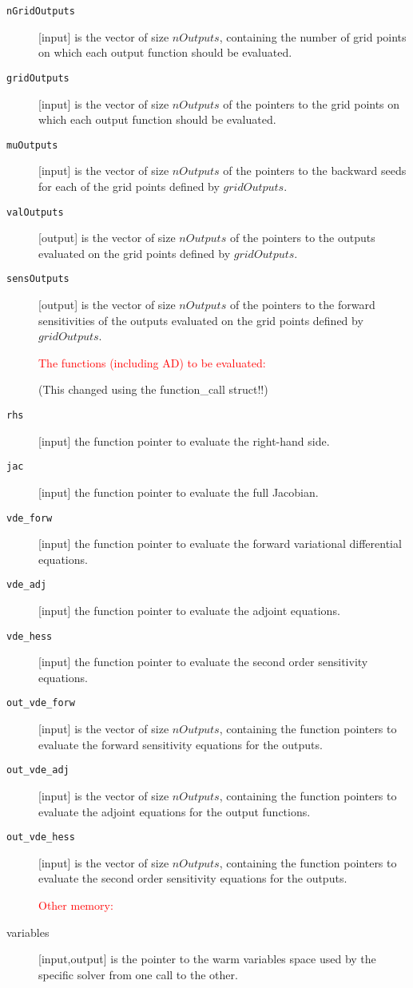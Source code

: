 \documentclass{report}
\begin{document}
\begin{description}
\item[{\tt nGridOutputs}] [input] is the vector of size $nOutputs$, containing the number of grid points on which each output function should be evaluated.
\item[{\tt gridOutputs}] [input] is the vector of size $nOutputs$ of the pointers to the grid points on which each output function should be evaluated.
\item[{\tt muOutputs}] [input] is the vector of size $nOutputs$ of the pointers to the backward seeds for each of the grid points defined by $gridOutputs$.
\item[{\tt valOutputs}] [output] is the vector of size $nOutputs$ of the pointers to the outputs evaluated on the grid points defined by $gridOutputs$.
\item[{\tt sensOutputs}] [output] is the vector of size $nOutputs$ of the pointers to the forward sensitivities of the outputs evaluated on the grid points defined by $gridOutputs$.
\item[] \textcolor{red}{The functions (including AD) to be evaluated:}
\item[] (This changed using the  function\_call struct!!)
\item[{\tt rhs}] [input] the function pointer to evaluate the right-hand side.
\item[{\tt jac}] [input] the function pointer to evaluate the full Jacobian.
\item[{\tt vde\_forw}] [input] the function pointer to evaluate the forward variational differential equations.
\item[{\tt vde\_adj}] [input] the function pointer to evaluate the adjoint equations.
\item[{\tt vde\_hess}] [input] the function pointer to evaluate the second order sensitivity equations.
\item[{\tt out\_vde\_forw}] [input] is the vector of size $nOutputs$, containing the function pointers to evaluate the forward sensitivity equations for the outputs.
\item[{\tt out\_vde\_adj}] [input] is the vector of size $nOutputs$, containing the function pointers to evaluate the adjoint equations for the output functions.
\item[{\tt out\_vde\_hess}] [input] is the vector of size $nOutputs$, containing the function pointers to evaluate the second order sensitivity equations for the outputs.
\item[] \textcolor{red}{Other memory:}
\item[variables] [input,output] is the pointer to the warm variables space used by the specific solver from one call to the other.

\end{description}
\end{document}
